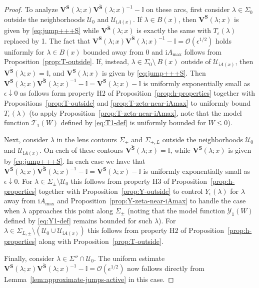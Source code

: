 \documentclass[12pt]{amsart}
\numberwithin{equation}{section}
\newcommand{\ii}{\mathrm{i}}
\newcommand{\SP}{\lambda}
\newcommand{\eps}{\epsilon}
\newcommand{\bigo}[1]{ \mathcal{O}\! \left( #1 \right) }
\begin{document}
\begin{proof}
To analyze $\mathbf{V}^\mathbf{S}(\SP;x) \mathbf{V}^{\breve{\mathbf{S}}}(\SP;x)^{-1} - \mathbb{I}$ on these arcs, first consider $\SP \in \Sigma_0$ outside the neighborhoods $\mathcal{U}_0$ and $\mathcal{U}_{\ii A(x)}$. If $\SP \in B(x)$, then  $\mathbf{V}^\mathbf{S}(\SP;x)$ is given by \eqref{eq:jump+++S} while $\mathbf{V}^{\breve{\mathbf{S}}}(\SP;x)$ is exactly the same with $T_\eps (\lambda)$ replaced by 1. The fact that $\mathbf{V}^\mathbf{S}(\SP;x) \mathbf{V}^{\breve{\mathbf{S}}}(\SP;x)^{-1} - \mathbb{I} = \bigo{\eps^{1/2}}$ holds uniformly for $\lambda \in B(x)$ bounded away from $0$ and $\ii A_{\mathrm{max}}$ follows from Proposition~\ref{prop:T-outside}. 
If,  instead, $\SP \in \Sigma_0 \setminus\ B(x)$ outside of $\mathcal{U}_{\ii A(x)}$, then $\mathbf{V}^{\breve{\mathbf{S}}}(\SP;x)  = \mathbb{I}$, and $\mathbf{V}^\mathbf{S}(\SP;x)$ is given by \eqref{eq:jump+++S}. Then $\mathbf{V}^\mathbf{S}(\SP;x) \mathbf{V}^{\breve{\mathbf{S}}}(\SP;x)^{-1} - \mathbb{I} = \mathbf{V}^\mathbf{S}(\SP;x) - \mathbb{I}$ is uniformly exponentially small as $\eps \downarrow 0$  as follows form property H2 of Proposition~\ref{prop:h-properties}  together with Propositions~\ref{prop:T-outside} and \ref{prop:T-zeta-near-iAmax} to uniformly bound $T_\epsilon(\lambda)$ (to apply Proposition~\ref{prop:T-zeta-near-iAmax}, note that the model function $\mathcal{T}_1(W)$ defined by \eqref{eq:T1-def} is uniformly bounded for $W\le 0$).

Next, consider $\SP$ in the lens contours $\Sigma_\pm$ and $\Sigma_{\pm,L}$ outside the neighborhoods $\mathcal{U}_0$ and $\mathcal{U}_{\ii A(x)}$. On each of these contours $\mathbf{V}^{\breve{\mathbf{S}}}(\SP;x) = \mathbb{I}$, while $\mathbf{V}^\mathbf{S}(\SP;x)$ is given by \eqref{eq:jump+++S}. In each case we have that $\mathbf{V}^\mathbf{S}(\SP;x) \mathbf{V}^{\breve{\mathbf{S}}}(\SP;x)^{-1} - \mathbb{I} = \mathbf{V}^\mathbf{S}(\SP;x) - \mathbb{I}$ is uniformly exponentially small as $\eps \downarrow 0$. 
%
For $\SP \in \Sigma_{\pm} \setminus \mathcal{U}_0$ this follows from property H3 of Proposition~\ref{prop:h-properties} together with Proposition~\ref{prop:Y-outside} to control $Y_\epsilon(\SP)$ for $\SP$ away from $\ii A_\mathrm{max}$ and Proposition~\ref{prop:Y-zeta-near-iAmax} to handle the case when $\SP$ approaches this point along $\Sigma_\pm$ (noting that the model function $\mathcal{Y}_1(W)$ defined by \eqref{eq:Y1-def} remains bounded for such $\SP$).
%
For $\SP \in \Sigma_{L,\pm} \setminus (\mathcal{U}_0 \cup \mathcal{U}_{\ii A(x)})$ this follows from property H2 of Proposition~\ref{prop:h-properties} along with Proposition~\ref{prop:T-outside}. 

Finally, consider $\SP \in \Sigma'' \cap \mathcal{U}_0$. The uniform estimate  $\mathbf{V}^\mathbf{S}(\SP;x) \mathbf{V}^{\breve{\mathbf{S}}}(\SP;x)^{-1} - \mathbb{I} = \bigo{\eps^{1/2}}$  now follows directly from Lemma~\ref{lem:approximate-jumps-active} in this case.
\end{proof}
\end{document}
